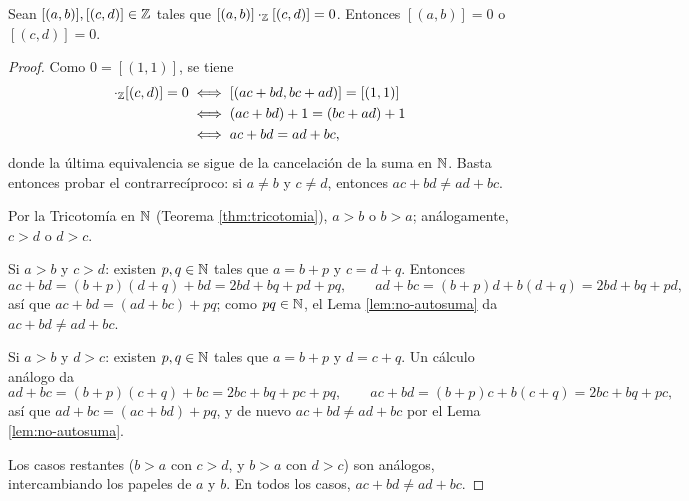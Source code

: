 \documentclass[12pt,a4paper]{book}
\begin{document}
    \begin{proposicion}
        \label{prop:sin-divisores-cero-Z}
        Sean $[(a,b)],[(c,d)]\in\mathbb{Z}$ tales que $[(a,b)]\cdot_{\mathbb{Z}}[(c,d)]=0$. Entonces $[(a,b)]=0$ o $[(c,d)]=0$.
    \end{proposicion}
    \begin{proof}
        Como $0=[(1,1)]$, se tiene
        \begin{align*}
            [(a,b)]\cdot_{\Z}[(c,d)]=0 &\iff [(ac+bd,bc+ad)]=[(1,1)] \\
            &\iff (ac+bd)+1=(bc+ad)+1 \\
            &\iff ac+bd=ad+bc,
        \end{align*}
        donde la última equivalencia se sigue de la cancelación de la suma en $\mathbb{N}$. Basta entonces probar el contrarrecíproco: si $a\neq b$ y $c\neq d$, entonces $ac+bd\neq ad+bc$.

        Por la Tricotomía en $\mathbb{N}$ (Teorema \ref{thm:tricotomia}), $a>b$ o $b>a$; análogamente, $c>d$ o $d>c$.

        Si $a>b$ y $c>d$: existen $p,q\in\mathbb{N}$ tales que $a=b+p$ y $c=d+q$. Entonces
        \begin{equation*}
            ac+bd = (b+p)(d+q)+bd = 2bd+bq+pd+pq, \qquad ad+bc = (b+p)d+b(d+q) = 2bd+bq+pd,
        \end{equation*}
        así que $ac+bd=(ad+bc)+pq$; como $pq\in\mathbb{N}$, el Lema \ref{lem:no-autosuma} da $ac+bd\neq ad+bc$.

        Si $a>b$ y $d>c$: existen $p,q\in\mathbb{N}$ tales que $a=b+p$ y $d=c+q$. Un cálculo análogo da
        \begin{equation*}
            ad+bc = (b+p)(c+q)+bc = 2bc+bq+pc+pq, \qquad ac+bd = (b+p)c+b(c+q) = 2bc+bq+pc,
        \end{equation*}
        así que $ad+bc=(ac+bd)+pq$, y de nuevo $ac+bd\neq ad+bc$ por el Lema \ref{lem:no-autosuma}.

        Los casos restantes ($b>a$ con $c>d$, y $b>a$ con $d>c$) son análogos, intercambiando los papeles de $a$ y $b$. En todos los casos, $ac+bd\neq ad+bc$.
    \end{proof}
\end{document}
